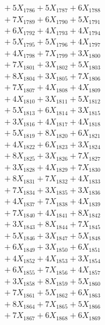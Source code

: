 \documentclass[a4paper,10pt]{article}
\begin{document}
{\begin{align}
&\;  + 5 X_{1786} + 5 X_{1787} + 6 X_{1788} \\[0.3ex]
&\;  + 7 X_{1789} + 6 X_{1790} + 5 X_{1791} \\[0.3ex]
&\;  + 6 X_{1792} + 4 X_{1793} + 4 X_{1794} \\[0.3ex]
&\;  + 5 X_{1795} + 5 X_{1796} + 4 X_{1797} \\[0.3ex]
&\;  + 4 X_{1798} + 7 X_{1799} + 3 X_{1800} \\[0.3ex]
&\;  + 7 X_{1801} + 3 X_{1802} + 5 X_{1803} \\[0.3ex]
&\;  + 8 X_{1804} + 3 X_{1805} + 7 X_{1806} \\[0.3ex]
&\;  + 7 X_{1807} + 4 X_{1808} + 4 X_{1809} \\[0.5ex]\allowbreak
&\;  + 4 X_{1810} + 3 X_{1811} + 5 X_{1812} \\[0.3ex]
&\;  + 5 X_{1813} + 6 X_{1814} + 3 X_{1815} \\[0.3ex]
&\;  + 3 X_{1816} + 4 X_{1817} + 4 X_{1818} \\[0.3ex]
&\;  + 5 X_{1819} + 8 X_{1820} + 6 X_{1821} \\[0.3ex]
&\;  + 4 X_{1822} + 6 X_{1823} + 3 X_{1824} \\[0.3ex]
&\;  + 8 X_{1825} + 3 X_{1826} + 7 X_{1827} \\[0.3ex]
&\;  + 3 X_{1828} + 4 X_{1829} + 7 X_{1830} \\[0.3ex]
&\;  + 8 X_{1831} + 7 X_{1832} + 4 X_{1833} \\[0.3ex]
&\;  + 7 X_{1834} + 3 X_{1835} + 3 X_{1836} \\[0.3ex]
&\;  + 4 X_{1837} + 7 X_{1838} + 4 X_{1839} \\[0.5ex]\allowbreak
&\;  + 7 X_{1840} + 4 X_{1841} + 8 X_{1842} \\[0.3ex]
&\;  + 3 X_{1843} + 8 X_{1844} + 7 X_{1845} \\[0.3ex]
&\;  + 5 X_{1846} + 3 X_{1847} + 5 X_{1848} \\[0.3ex]
&\;  + 6 X_{1849} + 3 X_{1850} + 6 X_{1851} \\[0.3ex]
&\;  + 4 X_{1852} + 4 X_{1853} + 3 X_{1854} \\[0.3ex]
&\;  + 6 X_{1855} + 7 X_{1856} + 4 X_{1857} \\[0.3ex]
&\;  + 3 X_{1858} + 8 X_{1859} + 5 X_{1860} \\[0.3ex]
&\;  + 7 X_{1861} + 5 X_{1862} + 6 X_{1863} \\[0.3ex]
&\;  + 8 X_{1864} + 7 X_{1865} + 5 X_{1866} \\[0.3ex]
&\;  + 7 X_{1867} + 6 X_{1868} + 6 X_{1869} \\[0.5ex]\allowbreak

\end{align}}
\end{document}
